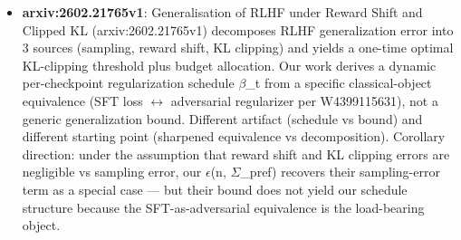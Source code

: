 \documentclass[10pt,a4paper]{article}
\begin{document}
\begin{tcolorbox}[colback=bgskill, colframe=cblue, title=\textbf{NoveltySkill — Idea Card (L3 Oral-Ready)}, breakable]
\begin{itemize}[leftmargin=*]
  \item \textbf{arxiv:2602.21765v1}: Generalisation of RLHF under Reward Shift and Clipped KL (arxiv:2602.21765v1) decomposes RLHF generalization error into 3 sources (sampling, reward shift, KL clipping) and yields a one-time optimal KL-clipping threshold plus budget allocation. Our work derives a dynamic per-checkpoint regularization schedule $\beta$\_t from a specific classical-object equivalence (SFT loss $\leftrightarrow$ adversarial regularizer per W4399115631), not a generic generalization bound. Different artifact (schedule vs bound) and different starting point (sharpened equivalence vs decomposition). Corollary direction: under the assumption that reward shift and KL clipping errors are negligible vs sampling error, our $\epsilon$(n, $\Sigma$\_pref) recovers their sampling-error term as a special case --- but their bound does not yield our schedule structure because the SFT-as-adversarial equivalence is the load-bearing object.
\end{itemize}


\end{tcolorbox}
\end{document}
